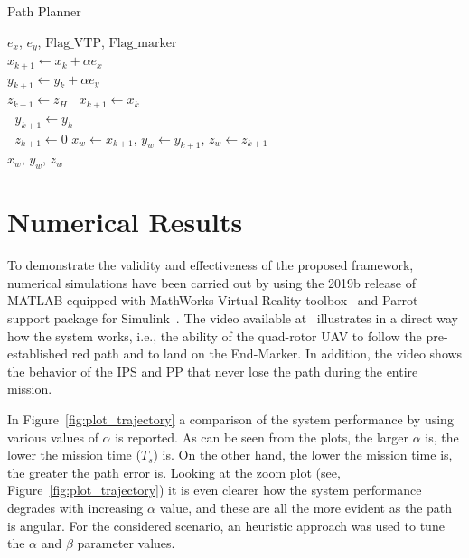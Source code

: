 \documentclass[a4paper,twocolumn,10pt]{article}
\begin{document}
    \begin{algorithm}
        \caption{Path Planner}
        \label{alg:pathPlanner}
        $e_x$, $e_y$, $\text{Flag\_VTP}$, $\text{Flag\_marker}$ \\
         {
            \quad $x_{k+1} \gets x_k + \alpha e_x$\\
            \quad $y_{k+1} \gets y_k + \alpha e_y$\\
            \quad $z_{k+1} \gets  z_H$
        }
         {
             {
            \qquad $\;$ $x_{k+1}  \gets x_k $\\
            \qquad $\;$ $y_{k+1} \gets y_k $\\
            \qquad $\;$ $z_{k+1} \gets 0$
            }
        }
        $x_w \gets x_{k+1}$, $y_w \gets y_{k+1}$, $z_w \gets z_{k+1}$ \\
        \Return $x_w$, $y_w$, $z_w$
    \end{algorithm} 

    \section{Numerical Results}
    \label{sec:simulationsResults}

    To demonstrate the validity and effectiveness of the proposed framework, numerical simulations have been carried out by using the 2019b release of MATLAB equipped with MathWorks Virtual Reality 
    toolbox~\cite{16_Mathworks_url} and Parrot support package for Simulink~\cite{15_Mathworks_url}. 
    The video available at~\cite{YouTubeVideo} illustrates in a direct way how the system works, i.e., the ability of the quad-rotor UAV to follow the pre-established red path and to land on the End-Marker. In addition, the video shows the behavior of the IPS and PP that never lose the path during the entire mission. 

    In Figure~\ref{fig:plot_trajectory} a comparison of the system performance by using various values of $\alpha$ is reported. As can be seen from the plots, the larger $\alpha$ is, the lower the mission time ($T_s$) is. On the other hand, the lower the mission time is, the greater the path 
    error is. Looking at the zoom plot (see, Figure~\ref{fig:plot_trajectory}) it is even clearer how the system performance degrades with increasing $\alpha$ value, and these are all the more evident as the path is angular. For the considered scenario, an heuristic approach was used to tune the $\alpha$ and $\beta$ parameter values.
\end{document}
